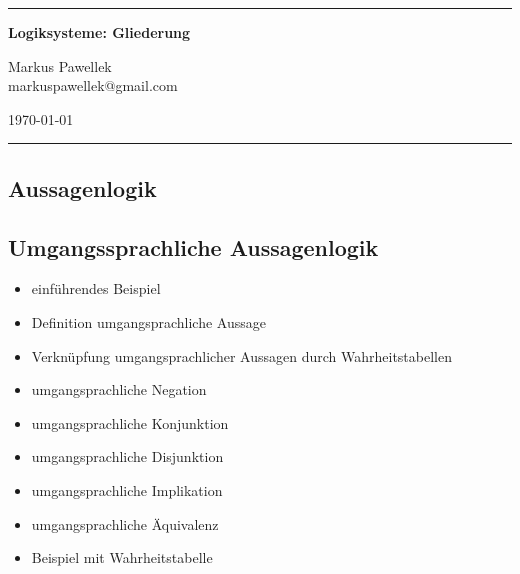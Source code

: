 \documentclass[8pt,fleqn,a4paper,twoside]{article}
\begin{document}
  \hrule
  \begin{center}
    \Large \bfseries Logiksysteme: Gliederung
  \end{center}
  \bigskip
  \footnotesize
  \begin{minipage}[c]{0.49\textwidth}
    Markus Pawellek \\
    markuspawellek@gmail.com
  \end{minipage}
  \hfill
  \begin{minipage}[c]{0.49\textwidth}
    \raggedleft
    \today
  \end{minipage}
  \medskip
  \normalsize
  \hrule
  \bigskip

  \begin{multicols}{2}

  \section{Aussagenlogik} %
  \label{sec:aussagenlogik}

    \subsection{Umgangssprachliche Aussagenlogik} %
    \label{sub:umgangssprachliche_aussagenlogik}
      \begin{itemize}
        \item einführendes Beispiel
        \item Definition umgangsprachliche Aussage
        \item Verknüpfung umgangsprachlicher Aussagen durch Wahrheitstabellen
        \item umgangsprachliche Negation
        \item umgangsprachliche Konjunktion
        \item umgangsprachliche Disjunktion
        \item umgangsprachliche Implikation
        \item umgangsprachliche Äquivalenz
        \item Beispiel mit Wahrheitstabelle
      \end{itemize}


\end{multicols}
\end{document}

